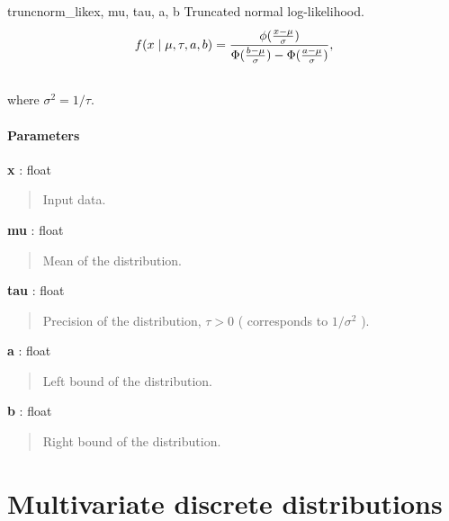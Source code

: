 \hypertarget{pymc.distributions.truncnorm_like}{}
\begin{funcdesc}{truncnorm\_like}{x, mu, tau, a, b}
Truncated normal log-likelihood.
\begin{gather}
\begin{split}f(x \mid \mu, \tau, a, b) = \frac{\phi(\frac{x-\mu}{\sigma})} {\Phi(\frac{b-\mu}{\sigma}) - \Phi(\frac{a-\mu}{\sigma})},\end{split}\notag\\\begin{split}\end{split}\notag
\end{gather}
where $\sigma^2=1/\tau$.
\paragraph{Parameters}\begin{paramlist}

\item[] \textbf{x} : float
\begin{quote}

Input data.
\end{quote}

\item[] \textbf{mu} : float
\begin{quote}

Mean of the distribution.
\end{quote}

\item[] \textbf{tau} : float
\begin{quote}

Precision of the distribution, $\tau>0$ ( corresponds to $1/\sigma^2$ ).
\end{quote}

\item[] \textbf{a} : float
\begin{quote}

Left bound of the distribution.
\end{quote}

\item[] \textbf{b} : float
\begin{quote}

Right bound of the distribution.
\end{quote}
\end{paramlist}
\end{funcdesc}


\section{Multivariate discrete distributions}

